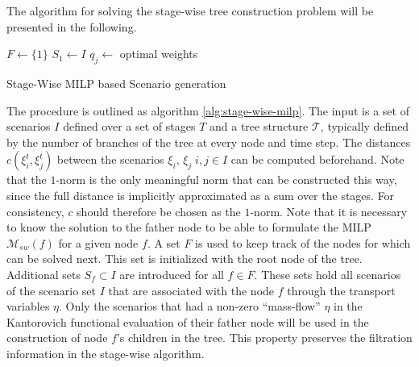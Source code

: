 The algorithm for solving the stage-wise tree construction problem will be presented in the following.
\begin{algorithm}
  $F \leftarrow \{1\}$
  $S_1 \leftarrow I$
  $q_j\leftarrow $ optimal weights 
  \caption{Stage-Wise MILP based Scenario generation}
  \label{alg:stage-wise-milp}
\end{algorithm}

The procedure is outlined as algorithm \ref{alg:stage-wise-milp}.
The input is a set of scenarios $I$ defined over a set of stages $T$ and a tree structure $\mathcal{T}$, typically defined by the number of branches of the tree at every node and time step.
The distances $c(\xi_i^t, \xi_j^t)$ between the scenarios $\xi_i,\,\xi_j\; i,j\in I$ can be computed beforehand.
Note that the $1$-norm is the only meaningful norm that can be constructed this way, since the full distance is implicitly approximated as a sum over the stages.
For consistency, $c$ should therefore be chosen as the $1$-norm.
Note that it is necessary to know the solution to the father node to be able to formulate the MILP $\mathcal{M}_{sw}(f)$ for a given node $f$.
A set $F$ is used to keep track of the nodes for which can be solved next.
This set is initialized with the root node of the tree.
Additional sets $S_f\subset I$ are introduced for all $f\in F$.
These sets hold all scenarios of the scenario set $I$ that are associated with the node $f$ through the transport variables $\eta$.
Only the scenarios that had a non-zero ``mass-flow'' $\eta$ in the Kantorovich functional evaluation of their father node will be used in the construction of node $f$'s children in the tree.
This property preserves the filtration information in the stage-wise algorithm.

